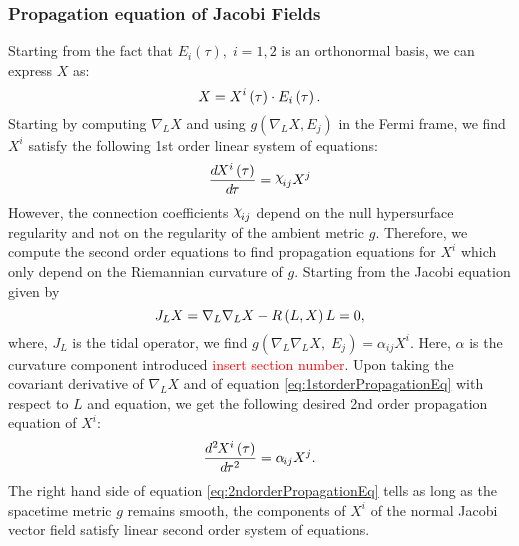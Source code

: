\documentclass[12pt, a4paper]{report}
\theoremstyle{bfnote}
\newcommand{\chits}{\raisebox{0.5ex}{$\chi$}} %
\begin{document}
\subsubsection{Propagation equation of Jacobi Fields}
Starting from the fact that $E_i\left(\tau\right),\; i = 1, 2$ is an orthonormal
basis, we can express $X$ as:
\begin{equation}{\label{eq:GeneralizedJacobiX}}
    X = X^i\left(\tau\right)\cdot E_i\left(\tau\right).
\end{equation}
Starting by computing $\nabla_L X$ and using $g\left(\nabla_L X, E_j\right)$ in
the Fermi frame, we find $X^i$ satisfy the following 1st order linear system of
equations:
\begin{equation}{\label{eq:1storderPropagationEq}}
    \frac{d\hspace{-0.1em}X^i\left(\tau\right)}{d\hspace{-0.1em}\tau} = \chits_{\hspace{-0.1em}{ij}}X^j
\end{equation}
However, the connection coefficients $\chits_{\hspace{-0.1em}ij}$ depend on the
null hypersurface regularity and not on the regularity of the ambient metric
$g$. Therefore, we compute the second order equations to find propagation
equations for $X^i$ which only depend on the Riemannian curvature of $g$.
Starting from the Jacobi equation given by 
\begin{equation}{\label{eq:Jacobiequation}}
J_L X = \nabla_L\nabla_L X - R\left(L, X\right)L = 0,
\end{equation} 
where, $J_L$ is the tidal operator, we find $g\left(\nabla_L\nabla_L X,\;
E_j\right) = \alpha_{ij}X^i$. Here, $\alpha$ is the curvature component
introduced \textcolor{red}{insert section number}. Upon taking the covariant
derivative of $\nabla_L X$ and of equation \eqref{eq:1storderPropagationEq} with
respect to $L$ and equation, we get the following desired 2nd order propagation
equation of $X^i$:
\begin{equation}{\label{eq:2ndorderPropagationEq}}
    \frac{d^2\hspace{-0.1em}X^i\left(\tau\right)}{d\hspace{-0.1em}\tau^2} = \alpha_{\hspace{-0.1em}{ij}}X^j.
\end{equation}
The right hand side of equation \eqref{eq:2ndorderPropagationEq} tells as long
as the spacetime metric $g$ remains smooth, the components of $X^i$ of the
normal Jacobi vector field satisfy linear second order system of equations.
\end{document}
